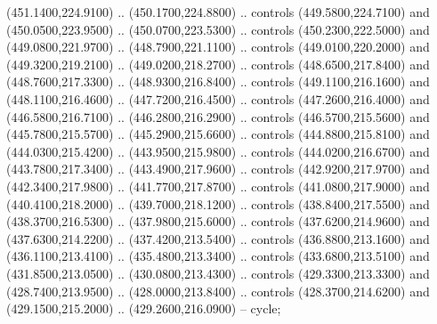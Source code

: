 {\begin{scope}[y=0.80pt, x=0.80pt, yscale=-1, xscale=1, inner sep=0pt, outer sep=0pt, #1]
      (451.1400,224.9100) .. (450.1700,224.8800) .. controls (449.5800,224.7100) and
      (450.0500,223.9500) .. (450.0700,223.5300) .. controls (450.2300,222.5000) and
      (449.0800,221.9700) .. (448.7900,221.1100) .. controls (449.0100,220.2000) and
      (449.3200,219.2100) .. (449.0200,218.2700) .. controls (448.6500,217.8400) and
      (448.7600,217.3300) .. (448.9300,216.8400) .. controls (449.1100,216.1600) and
      (448.1100,216.4600) .. (447.7200,216.4500) .. controls (447.2600,216.4000) and
      (446.5800,216.7100) .. (446.2800,216.2900) .. controls (446.5700,215.5600) and
      (445.7800,215.5700) .. (445.2900,215.6600) .. controls (444.8800,215.8100) and
      (444.0300,215.4200) .. (443.9500,215.9800) .. controls (444.0200,216.6700) and
      (443.7800,217.3400) .. (443.4900,217.9600) .. controls (442.9200,217.9700) and
      (442.3400,217.9800) .. (441.7700,217.8700) .. controls (441.0800,217.9000) and
      (440.4100,218.2000) .. (439.7000,218.1200) .. controls (438.8400,217.5500) and
      (438.3700,216.5300) .. (437.9800,215.6000) .. controls (437.6200,214.9600) and
      (437.6300,214.2200) .. (437.4200,213.5400) .. controls (436.8800,213.1600) and
      (436.1100,213.4100) .. (435.4800,213.3400) .. controls (433.6800,213.5100) and
      (431.8500,213.0500) .. (430.0800,213.4300) .. controls (429.3300,213.3300) and
      (428.7400,213.9500) .. (428.0000,213.8400) .. controls (428.3700,214.6200) and
      (429.1500,215.2000) .. (429.2600,216.0900) -- cycle;


\end{scope}}
